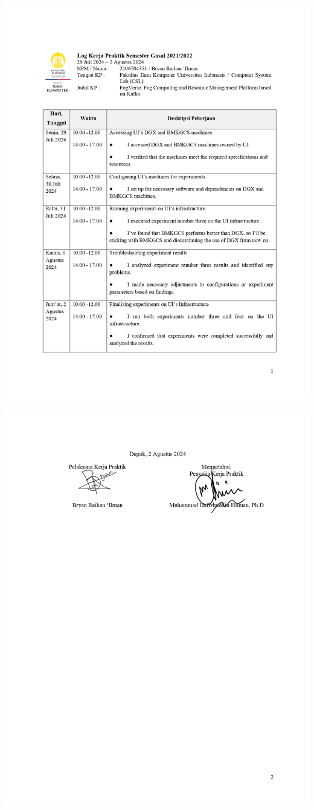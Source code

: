 \includegraphics[width=1\textwidth]{assets/pics/Log-9-CSL-Bryan Raihan Ilman-0001.jpg}

\includegraphics[width=1\textwidth]{assets/pics/Log-9-CSL-Bryan Raihan Ilman-0002.jpg}

